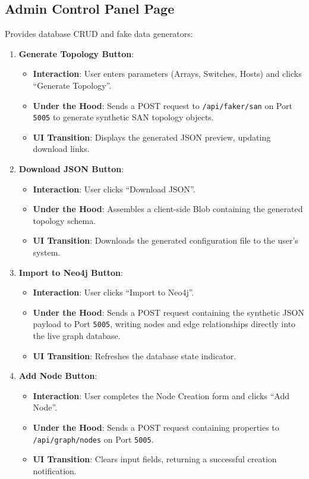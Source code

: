 \documentclass[11pt,a4paper]{article}
\begin{document}
\subsection{Admin Control Panel Page}
Provides database CRUD and fake data generators:
\begin{enumerate}
    \item \textbf{Generate Topology Button}:
    \begin{itemize}
        \item \textbf{Interaction}: User enters parameters (Arrays, Switches, Hosts) and clicks ``Generate Topology''.
        \item \textbf{Under the Hood}: Sends a POST request to \texttt{/api/faker/san} on Port \texttt{5005} to generate synthetic SAN topology objects.
        \item \textbf{UI Transition}: Displays the generated JSON preview, updating download links.
    \end{itemize}
    
    \item \textbf{Download JSON Button}:
    \begin{itemize}
        \item \textbf{Interaction}: User clicks ``Download JSON''.
        \item \textbf{Under the Hood}: Assembles a client-side Blob containing the generated topology schema.
        \item \textbf{UI Transition}: Downloads the generated configuration file to the user's system.
    \end{itemize}
    
    \item \textbf{Import to Neo4j Button}:
    \begin{itemize}
        \item \textbf{Interaction}: User clicks ``Import to Neo4j''.
        \item \textbf{Under the Hood}: Sends a POST request containing the synthetic JSON payload to Port \texttt{5005}, writing nodes and edge relationships directly into the live graph database.
        \item \textbf{UI Transition}: Refreshes the database state indicator.
    \end{itemize}
    
    \item \textbf{Add Node Button}:
    \begin{itemize}
        \item \textbf{Interaction}: User completes the Node Creation form and clicks ``Add Node''.
        \item \textbf{Under the Hood}: Sends a POST request containing properties to \texttt{/api/graph/nodes} on Port \texttt{5005}.
        \item \textbf{UI Transition}: Clears input fields, returning a successful creation notification.
    \end{itemize}
    

\end{enumerate}
\end{document}
